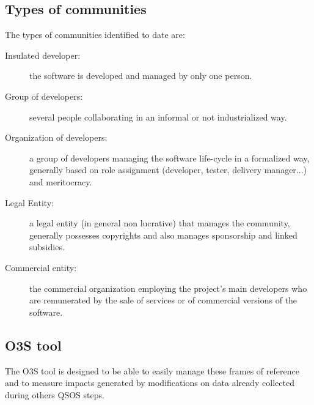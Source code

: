 \subsection{Types of communities}
The types of communities identified to date are:
\begin{description}
\item [Insulated developer:] the software is developed and managed by only one person.
\item [Group of developers:] several people collaborating in an informal or not industrialized way.
\item [Organization of developers:] a group of developers managing the software life-cycle in a formalized way, generally based on role assignment (developer, tester, delivery manager...) and meritocracy.
\item [Legal Entity:] a legal entity (in general non lucrative) that manages the community, generally possesses copyrights and also manages sponsorship and linked subsidies.
\item [Commercial entity:] the commercial organization employing the project's main developers who are remunerated by the sale of services or of commercial versions of the software.
\end{description}


\subsection{O3S tool}
The O3S tool is designed to be able to easily manage these frames of reference and to measure 
impacts generated by modifications on data already collected during others QSOS steps.

